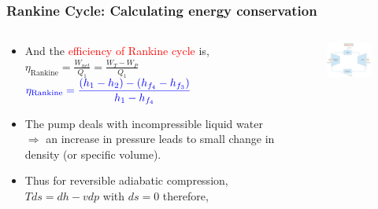 \documentclass[10pt,compress]{beamer}
\begin{document}
\begin{frame}
 \frametitle{Rankine Cycle: Calculating energy conservation}
  \begin{columns}
   \begin{column}[c]{0.4\linewidth}
    \begin{itemize}
      \item <1-> And the \textcolor{red}{efficiency of Rankine cycle} is,
       $\eta_{\text{Rankine}}=\displaystyle\frac{W_{net}}{Q_{1}}=\displaystyle\frac{W_{T}-W_{P}}{Q_{1}}$ \\
       $\textcolor{blue}{\eta_{\text{Rankine}}=\displaystyle\frac{\left(h_{1}-h_{2}\right)-\left(h_{f_{4}}-h_{f_{3}}\right)}{h_{1}-h_{f_{4}}}}$
      \item <2-> The pump deals with incompressible liquid water $\Rightarrow$ an increase in pressure leads to small change in density (or specific volume). 
      \item <3-> Thus for reversible adiabatic compression, $Tds=dh-vdp$ with $ds=0$ therefore,
     \end{itemize}
    \end{column}
    \begin{column}[c]{0.6\linewidth}
     \begin{figure}%
      \begin{center}
       \includegraphics[width=6.5cm,clip]{./Pics/Simple_Rankine_Cycle}

\end{center}
\end{figure}
\end{column}
\end{columns}
\end{frame}
\end{document}

